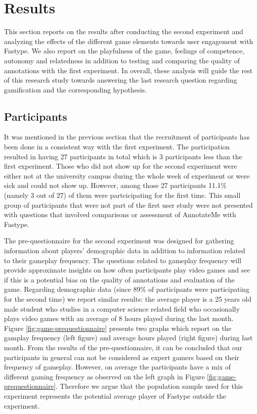 \section{Results}
\label{game:results}
This section reports on the results after conducting the second experiment and analyzing the effects of the different game elements towards user engagement with Fastype. We also report on the playfulness of the game, feelings of competence, autonomy and relatedness in addition to testing and comparing the quality of annotations with the first experiment. In overall, these analysis will guide the rest of this research study towards answering the last research question regarding gamification and the corresponding hypothesis.

\subsection{Participants}
It was mentioned in the previous section that the recruitment of participants has been done in a consistent way with the first experiment. The participation resulted in having 27 participants in total which is 3 participants less than the first experiment. Those who did not show up for the second experiment were either not at the university campus during the whole week of experiment or were sick and could not show up. However, among those 27 participants 11.1\% (namely 3 out of 27) of them were partcicipating for the first time. This small group of participants that were not part of the first user study were not presented with questions that involved comparisons or assessment of AnnotateMe with Fastype.

The pre-questionnaire for the second experiment was designed for gathering information about players' demographic data in addition to information related to their gameplay frequency. The questions related to gameplay frequency will provide approximate insights on how often participants play video games and see if this is a potential bias on the quality of annotations and evaluation of the game. Regarding demographic data (since 89\% of participants were participating for the second time) we report similar results: the average player is a 25 years old male student who studies in a computer science related field who occasionally plays video games with an average of 8 hours played during the last month. Figure \ref{fig:game-prequestionnaire} presents two graphs which report on the gamplay frequency (left figure) and average hours played (right figure) during last month. From the results of the pre-questionnaire, it can be concluded that our participants in general can not be considered as expert gamers based on their frequency of gameplay. However, on average the participants have a mix of different gaming frequency as observed on the left graph in Figure \ref{fig:game-prequestionnaire}. Therefore we argue that the population sample used for this experiment represents the potential average player of Fastype outside the experiment. 


